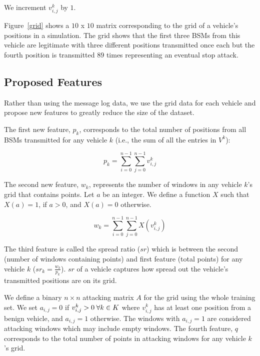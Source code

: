 \documentclass[conference]{IEEEtran}
\begin{document}
We increment $v^k_{i,j}$ by $1$.

Figure~\ref{grid} shows a $10$ x $10$ matrix corresponding to the grid of a vehicle's positions in a simulation. The grid shows that the first three BSMs from this vehicle are legitimate with three different positions transmitted once each but the fourth position is transmitted $89$ times representing an eventual stop attack.

\subsection{Proposed Features}

Rather than using the message log data, we use the grid data for each vehicle and propose new features to greatly reduce the size of the dataset. 

The first new feature, $p_k$, corresponds to the total number of positions from all BSMs transmitted for any vehicle $k$ (i.e., the sum of all the entries in $V^k$):

\begin{equation}
    p_k = \sum_{i = 0}^{n-1} \sum_{j = 0}^{n-1} v^k_{i,j}
\end{equation}

The second new feature, $w_k$, represents the number of windows in any vehicle $k$'s grid that contains points. Let $a$ be an integer. We define a function $X$ such that $X(a) = 1$, if $a > 0$, and $X(a) = 0$ otherwise.

\begin{equation}
    w_k = \sum_{i = 0}^{n-1} \sum_{j = 0}^{n-1} X(v^k_{i,j})
\end{equation}

The third feature is called the spread ratio ($sr$) which is between the second (number of windows containing points) and first feature (total points) for any vehicle $k$ ($sr_k = \frac{w_k}{p_k}$). $sr$ of a vehicle captures how spread out the vehicle's transmitted positions are on its grid. 

We define a binary $n \times n$ attacking matrix $A$ for the grid using the whole training set. We set $a_{i,j} = 0$ if $v^k_{i,j} > 0 \hspace{0.9mm} \forall k \in K$ where $v^k_{i,j}$ has at least one position from a benign vehicle, and $a_{i,j} = 1$ otherwise. The windows with $a_{i,j} = 1$ are considered attacking windows which may include empty windows. The fourth feature, $q$ corresponds to the total number of points in attacking windows for any vehicle $k$'s grid.
\end{document}
